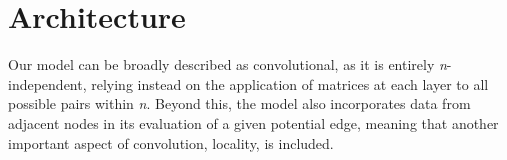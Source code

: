 
\chapter{Architecture}
Our model can be broadly described as convolutional, as it is entirely 
\textit{n}-independent, relying instead on the application of matrices at each 
layer to all possible pairs within \textit{n}. Beyond this, the model also 
incorporates data from adjacent nodes in its evaluation of a given potential 
edge, meaning that another important aspect of convolution, locality, is 
included.

